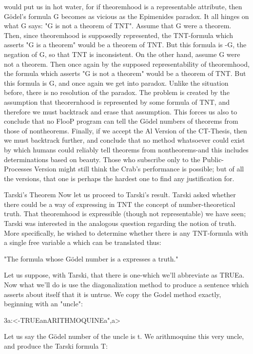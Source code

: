 {would put us in hot water, for if theoremhood is a representable attribute, then Gödel’s
formula G becomes as vicious as the Epimenides paradox.
        It all hinges on what G says: "G is not a theorem of TNT". Assume that G were a
theorem. Then, since theoremhood is supposedly represented, the TNT-formula which
asserts "G is a theorem" would be a theorem of TNT. But this formula is -G, the negation
of G, so that TNT is inconsistent. On the other hand, assume G were not a theorem. Then
once again by the supposed representability of theoremhood, the formula which asserts
"G is not a theorem" would be a theorem of TNT. But this formula is G, and once again
we get into paradox. Unlike the situation before, there is no resolution of the paradox.
The problem is created by the assumption that theorernhood is represented by some
formula of TNT, and therefore we must backtrack and erase that assumption. This forces
us also to conclude that no FlooP program can tell the Gödel numbers of theorems from
those of nontheorems. Finally, if we accept the Al Version of the CT-Thesis, then we
must backtrack further, and conclude that no method whatsoever could exist by which
humans could reliably tell theorems from nontheorems-and this includes determinations
based on beauty. Those who subscribe only to the Public-Processes Version might still
think the Crab's performance is possible; but of all the versions, that one is perhaps the
hardest one to find any justification for.

                                 Tarski's Theorem
Now let us proceed to Tarski's result. Tarski asked whether there could be a way of
expressing in TNT the concept of number-theoretical truth. That theoremhood is
expressible (though not representable) we have seen; Tarski was interested in the
analogous question regarding the notion of truth. More specifically, he wished to
determine whether there is any TNT-formula with a single free variable a which can be
translated thus:

               "The formula whose Gödel number is a expresses a truth."

Let us suppose, with Tarski, that there is one-which we'll abbreviate as TRUE{a}. Now
what we'll do is use the diagonalization method to produce a sentence which asserts about
itself that it is untrue. We copy the Godel method exactly, beginning with an "uncle":

                       3a:<-TRUE{a}nARITHMOQUINE{a",a}>

Let us say the Gödel number of the uncle is t. We arithmoquine this very uncle, and
produce the Tarski formula T:

}
